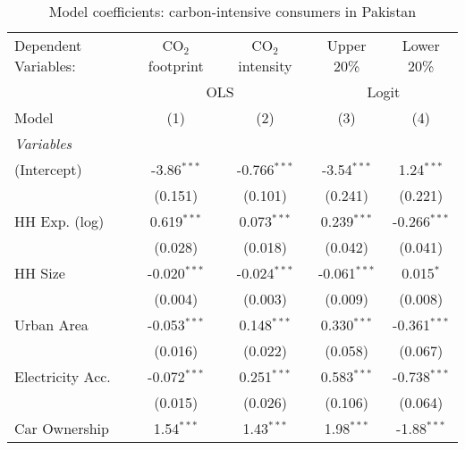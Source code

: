 
\begin{table}[htbp!]
   \centering
   \small
   \begin{adjustbox}{width = 1\textwidth, max height = 0.95\textheight, center}
      \begin{threeparttable}[b]
         \caption{\label{tab:Logit_1_PAK} Model coefficients: carbon-intensive consumers in Pakistan}
         \begin{tabular}{lcccc}
            \tabularnewline \midrule \midrule
            Dependent Variables: & CO$_{2}$ footprint & CO$_{2}$ intensity & Upper 20\%     & Lower 20\%\\   
             & \multicolumn{2}{c}{OLS} & \multicolumn{2}{c}{Logit} \\ 
            Model                & (1)                & (2)                & (3)            & (4)\\  
            \midrule
            \emph{Variables}\\
            (Intercept)          & -3.86$^{***}$      & -0.766$^{***}$     & -3.54$^{***}$  & 1.24$^{***}$\\   
                                 & (0.151)            & (0.101)            & (0.241)        & (0.221)\\   
            HH Exp. (log)        & 0.619$^{***}$      & 0.073$^{***}$      & 0.239$^{***}$  & -0.266$^{***}$\\   
                                 & (0.028)            & (0.018)            & (0.042)        & (0.041)\\   
            HH Size              & -0.020$^{***}$     & -0.024$^{***}$     & -0.061$^{***}$ & 0.015$^{*}$\\   
                                 & (0.004)            & (0.003)            & (0.009)        & (0.008)\\   
            Urban Area           & -0.053$^{***}$     & 0.148$^{***}$      & 0.330$^{***}$  & -0.361$^{***}$\\   
                                 & (0.016)            & (0.022)            & (0.058)        & (0.067)\\   
            Electricity Acc.     & -0.072$^{***}$     & 0.251$^{***}$      & 0.583$^{***}$  & -0.738$^{***}$\\   
                                 & (0.015)            & (0.026)            & (0.106)        & (0.064)\\   
            Car Ownership        & 1.54$^{***}$       & 1.43$^{***}$       & 1.98$^{***}$   & -1.88$^{***}$\\   

\end{tabular}
\end{threeparttable}
\end{adjustbox}
\end{table}
